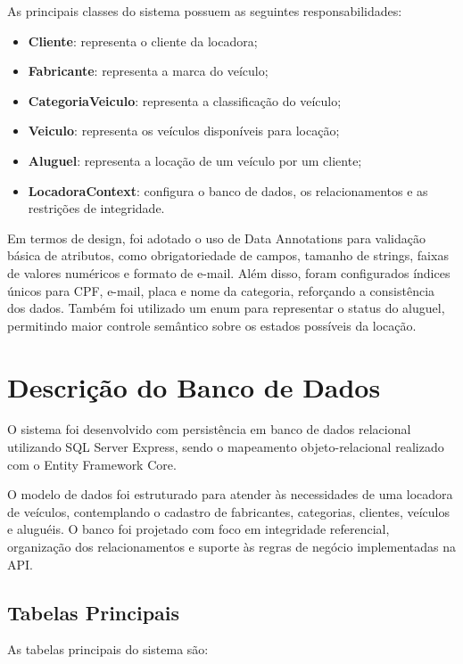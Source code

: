 \documentclass[12pt]{article}
\begin{document}
As principais classes do sistema possuem as seguintes responsabilidades:

\begin{itemize}
\item \textbf{Cliente}: representa o cliente da locadora;
\item \textbf{Fabricante}: representa a marca do veículo;
\item \textbf{CategoriaVeiculo}: representa a classificação do veículo;
\item \textbf{Veiculo}: representa os veículos disponíveis para locação;
\item \textbf{Aluguel}: representa a locação de um veículo por um cliente;
\item \textbf{LocadoraContext}: configura o banco de dados, os relacionamentos e as restrições de integridade.
\end{itemize}

Em termos de design, foi adotado o uso de Data Annotations para validação básica de atributos, como obrigatoriedade de campos, tamanho de strings, faixas de valores numéricos e formato de e-mail. Além disso, foram configurados índices únicos para CPF, e-mail, placa e nome da categoria, reforçando a consistência dos dados. Também foi utilizado um enum para representar o status do aluguel, permitindo maior controle semântico sobre os estados possíveis da locação.

\section{Descrição do Banco de Dados}

O sistema foi desenvolvido com persistência em banco de dados relacional utilizando SQL Server Express, sendo o mapeamento objeto-relacional realizado com o Entity Framework Core.

O modelo de dados foi estruturado para atender às necessidades de uma locadora de veículos, contemplando o cadastro de fabricantes, categorias, clientes, veículos e aluguéis. O banco foi projetado com foco em integridade referencial, organização dos relacionamentos e suporte às regras de negócio implementadas na API.

\subsection{Tabelas Principais}

As tabelas principais do sistema são:
\end{document}
